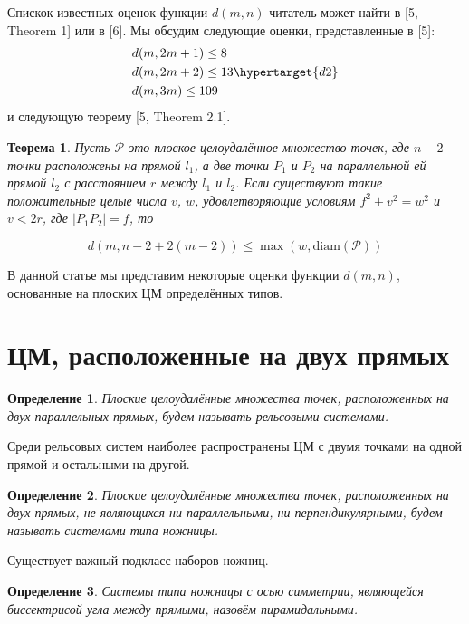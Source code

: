 \documentclass[12pt]{article}
\theoremstyle{theorem}
\newtheorem{theorem}{Теорема}
\theoremstyle{dfn}
\newtheorem{dfn}{Определение}
\theoremstyle{remark}
\begin{document}
Спискок известных оценок функции $d(m, n)$
читатель может найти в [5, Theorem 1] или в [6].
Мы обсудим следующие оценки, представленные в [5]:
\begin{align}
	&d(m, 2m + 1) \leq 8\\
	&d(m, 2m + 2) \leq 13 \hypertarget{d2}\\
	&d(m, 3m) \leq 109
\end{align}
и следующую теорему [5, Theorem 2.1].

\begin{theorem}
	Пусть $\mathcal{P}$ это плоское целоудалённое множество точек, 
	где $n - 2$ точки  расположены на прямой $l_{1}$, а две точки 
	$P_{1}$ и  $P_{2}$ на параллельной ей прямой $l_{2}$ с расстоянием 
	$r$ между $l_{1}$ и $l_{2}$. Если существуют такие положительные целые числа 
	$v$, $w$, удовлетворяющие условиям $f^{2} + v^{2}
	= w^{2}$ и $v < 2r$, где $|P_{1}P_{2}| = f$,
	то

	\begin{equation}\label{formula1}
		d(m, n - 2 + 2(m - 2)) \leq \max(w, \operatorname{diam(\mathcal{P})})
	\end{equation}

\end{theorem}

В данной статье мы представим некоторые оценки функции $d(m,n)$, основанные на плоских ЦМ определённых типов.

\section{ЦМ, расположенные на двух прямых}

\begin{dfn}
    Плоские целоудалённые множества точек, расположенных на двух параллельных прямых, будем называть рельсовыми системами.
\end{dfn}

Среди рельсовых систем наиболее распространены ЦМ с двумя точками на одной прямой и остальными на другой.


\begin{dfn}
    Плоские целоудалённые множества точек, расположенных на двух прямых, 
    не являющихся ни параллельными, ни перпендикулярными, будем называть системами
    типа ножницы.
\end{dfn}

Существует важный подкласс наборов ножниц.

\begin{dfn}
    Системы типа ножницы с осью симметрии, 
    являющейся биссектрисой угла между прямыми, назовём пирамидальными.
\end{dfn}
\end{document}
